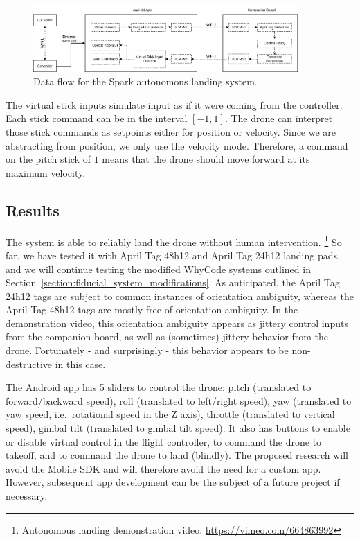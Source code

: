 \begin{figure}[ht]
    \centering
    \includegraphics[width=0.9\textwidth]{images/spark_architecture.drawio}
    \caption{Data flow for the Spark autonomous landing system.}
    \label{figure:spark_architecture}
\end{figure}

The virtual stick inputs simulate input as if it were coming from the controller.
Each stick command can be in the interval $[-1, 1]$.
The drone can interpret those stick commands as setpoints either for position or velocity.
Since we are abstracting from position, we only use the velocity mode.
Therefore, a command on the pitch stick of $1$
means that the drone should move forward at its maximum velocity.

\subsection{Results}

The system is able to reliably land the drone without human intervention.
\footnote{Autonomous landing demonstration video: \url{https://vimeo.com/664863992}}
So far, we have tested it with April Tag 48h12 and April Tag 24h12 landing pads,
and we will continue testing the modified WhyCode systems outlined in Section~\ref{section:fiducial_system_modifications}.
As anticipated, the April Tag 24h12 tags are subject to common instances of orientation ambiguity,
whereas the April Tag 48h12 tags are mostly free of orientation ambiguity.
In the demonstration video, this orientation ambiguity appears as jittery control inputs from the companion board,
as well as (sometimes) jittery behavior from the drone.
Fortunately - and surprisingly - this behavior appears to be non-destructive in this case.

The Android app has 5 sliders to control the drone:
pitch (translated to forward/backward speed),
roll (translated to left/right speed),
yaw (translated to yaw speed, i.e.~rotational speed in the Z axis),
throttle (translated to vertical speed),
gimbal tilt (translated to gimbal tilt speed).
It also has buttons to enable or disable virtual control in the flight controller,
to command the drone to takeoff,
and to command the drone to land (blindly).
The proposed research will avoid the Mobile SDK and will therefore avoid the need for a custom app.
However, subsequent app development can be the subject of a future project if necessary.

